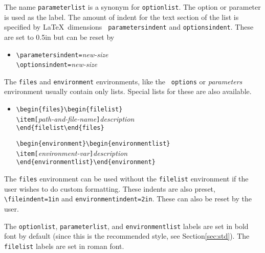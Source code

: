 The name {\tt parameterlist} is a synonym for {\tt optionlist}.  The
option or parameter is used as the label.  The amount of indent for
the text section of the list is specified by \LaTeX\ dimensions {\tt
parametersindent} and {\tt optionsindent}.  These are set to 0.5in but
can be reset by 
  \begin{itemize}
    \item[]
          \verb|\parametersindent=|{\it new-size}\\
          \verb|\optionsindent=|{\it new-size}
  \end{itemize}

The {\tt files} and {\tt environment} environments, like the {\tt
options} or {\it parameters} environment usually contain only lists.  
Special lists for these are also available.
  \begin{itemize}
    \item[]
          \verb|\begin{files}\begin{filelist}|\\
          \verb|\item[|{\it path-and-file-name}\verb|]|{\it description}\\
          \verb|\end{filelist\end{files}|

          \verb|\begin{environment}\begin{environmentlist}|\\
          \verb|\item[|{\it environment-var}\verb|]|{\it description}\\
          \verb|\end{environmentlist}\end{environment}|
  \end{itemize}
The {\tt files} environment can be used without the {\tt filelist}
environment if the user wishes to do custom formatting.  These indents
are also preset, \verb|\fileindent=1in| and
\verb|environmentindent=2in|.  These can also be reset by the user.

The {\tt optionlist}, {\tt parameterlist}, and {\tt environmentlist}
labels are set in bold font by default (since this is the recommended
style, see Section\ref{sec:std}).  The {\tt filelist} labels are set
in roman font.

